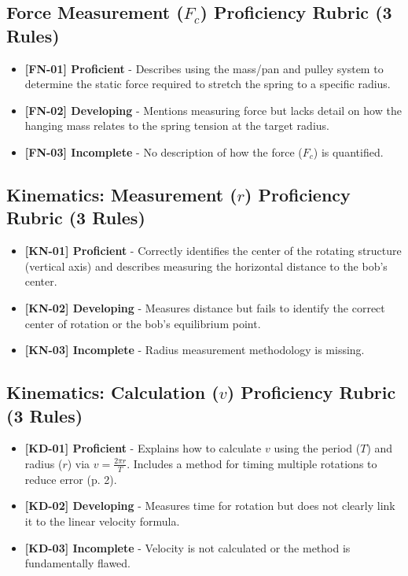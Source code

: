 \documentclass{article}
\begin{document}
\subsection*{Force Measurement ($F_c$) Proficiency Rubric (3 Rules)}
\begin{itemize}
\item \textbf{ [FN-01] Proficient } - Describes using the mass/pan and pulley system to determine the static force required to stretch the spring to a specific radius.
\item \textbf{ [FN-02] Developing } - Mentions measuring force but lacks detail on how the hanging mass relates to the spring tension at the target radius.
\item \textbf{ [FN-03] Incomplete } - No description of how the force ($F_c$) is quantified.
\end{itemize}

\subsection*{Kinematics: Measurement ($ r $) Proficiency Rubric (3 Rules)}
\begin{itemize}
\item \textbf{ [KN-01] Proficient } - Correctly identifies the center of the rotating structure (vertical axis) and describes measuring the horizontal distance to the bob's center.
\item \textbf{ [KN-02] Developing } - Measures distance but fails to identify the correct center of rotation or the bob's equilibrium point.
\item \textbf{ [KN-03] Incomplete } - Radius measurement methodology is missing.
\end{itemize}

\subsection*{Kinematics: Calculation ($ v $) Proficiency Rubric (3 Rules)}
\begin{itemize}
\item \textbf{ [KD-01] Proficient } - Explains how to calculate $ v $ using the period ($ T $) and radius ($ r $) via $ v = \frac {2 \pi r}{ T } $. Includes a method for timing multiple rotations to reduce error (p. 2).
\item \textbf{ [KD-02] Developing } - Measures time for rotation but does not clearly link it to the linear velocity formula.
\item \textbf{ [KD-03] Incomplete } - Velocity is not calculated or the method is fundamentally flawed.
\end{itemize}
\end{document}

